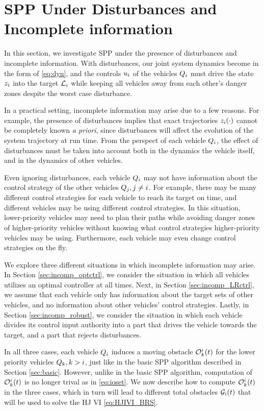 \section{SPP Under Disturbances and Incomplete information \label{sec:incomp}}
In this section, we investigate SPP under the presence of disturbances and incomplete information. With disturbances, our joint system dynamics become in the form of \eqref{eq:dyn}, and the controls $u_i$ of the vehicles $Q_{i}$ must drive the state $z_i$ into the target $\mathcal{L}_i$ while keeping all vehicles away from each other's danger zones despite the worst case disturbance.

In a practical setting, incomplete information may arise due to a few reasons. For example, the presence of disturbances implies that exact trajectories $z_i(\cdot)$ cannot be completely known \textit{a priori}, since disturbances will affect the evolution of the system trajectory at run time. From the perspect of each vehicle $Q_{i}$, the effect of disturbances must be taken into account both in the dynamics the vehicle itself, and in the dynamics of other vehicles.

Even ignoring disturbances, each vehicle $Q_{i}$ may not have information about the control strategy of the other vehicles $Q_{j}, j\neq i$. For example, there may be many different control strategies for each vehicle to reach its target on time, and different vehicles may be using different control strategies. In this situation, lower-priority vehicles may need to plan their paths while avoiding danger zones of higher-priority vehicles without knowing what control strategies higher-priority vehicles may be using. Furthermore, each vehicle may even change control strategies on the fly.

We explore three different situations in which incomplete information may arise. In Section \ref{sec:incomp_optctrl}, we consider the situation in which all vehicles utilizes an optimal controller at all times. Next, in Section \ref{sec:incomp_LRctrl}, we assume that each vehicle only has information about the target sets of other vehicles, and no information about other vehicles' control strategies. Lastly, in Section \ref{sec:incomp_robust}, we consider the situation in which each vehicle divides its control input authority into a part that drives the vehicle towards the target, and a part that rejects disturbances.

In all three cases, each vehicle $Q_{i}$ induces a moving obstacle $\mathcal{O}_k^i(t)$ for the lower priority vehicles $Q_{k}, k>i$, just like in the basic SPP algorithm described in Section \ref{sec:basic}. However, unlike in the basic SPP algorithm, computation of $\mathcal{O}_k^i(t)$ is no longer trival as in \eqref{eq:ioset}. We now describe how to compute $\mathcal{O}_k^i(t)$ in the three cases, which in turn will lead to different total obstacles $\mathcal{G}_i(t)$ that will be used to solve the HJ VI \eqref{eq:HJIVI_BRS}.


